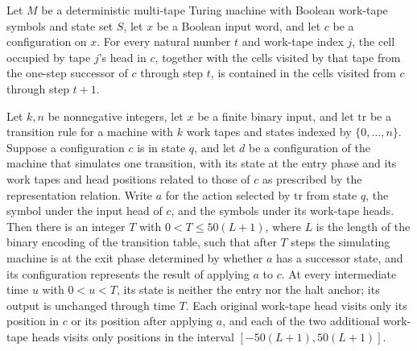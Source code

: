 \begin{lemma}
\label{Turing.MultiTapeTM.visitedByTapeHead_step_subset}
\leanok
{}
Let $M$ be a deterministic multi-tape Turing machine with Boolean work-tape symbols and
state set $S$, let $x$ be a Boolean input word, and let $c$ be a configuration on $x$.
For every natural number $t$ and work-tape index $j$, the cell occupied by tape $j$'s
head in $c$, together with the cells visited by that tape from the one-step successor of
$c$ through step $t$, is contained in the cells visited from $c$ through step $t+1$.
\end{lemma}

\begin{theorem}
\label{Turing.StepBlock.roundTM_visited}
\leanok
{}
Let $k,n$ be nonnegative integers, let $x$ be a finite binary input, and let
$\mathrm{tr}$ be a transition rule for a machine with $k$ work tapes and states indexed
by $\{0,\ldots,n\}$. Suppose a configuration $c$ is in state $q$, and let $d$ be a
configuration of the machine that simulates one transition, with its state at the entry
phase and its work tapes and head positions related to those of $c$ as prescribed by the
representation relation. Write $a$ for the action selected by $\mathrm{tr}$ from state
$q$, the symbol under the input head of $c$, and the symbols under its work-tape heads.
Then there is an integer $T$ with $0<T\le 50(L+1)$, where $L$ is the length of the
binary encoding of the transition table, such that after $T$ steps the simulating
machine is at the exit phase determined by whether $a$ has a successor state, and its
configuration represents the result of applying $a$ to $c$. At every intermediate time
$u$ with $0<u<T$, its state is neither the entry nor the halt anchor; its output is
unchanged through time $T$. Each original work-tape head visits only its position in $c$
or its position after applying $a$, and each of the two additional work-tape heads
visits only positions in the interval $[-50(L+1),50(L+1)]$.
\end{theorem}

